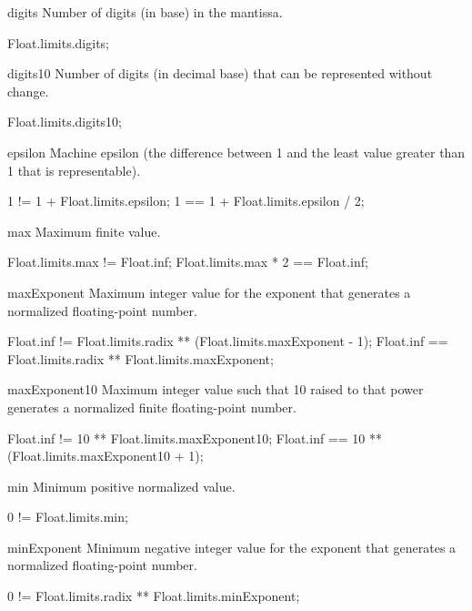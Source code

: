 \begin{urbiscriptapi}
\item[digits] Number of digits (in  base) in the mantissa.
\begin{urbiassert}
Float.limits.digits;
\end{urbiassert}


\item[digits10]
  Number of digits (in decimal base) that can be represented without
  change.
\begin{urbiassert}
Float.limits.digits10;
\end{urbiassert}


\item[epsilon]
  Machine epsilon (the difference between 1 and the least value
  greater than 1 that is representable).
\begin{urbiassert}
1 != 1 + Float.limits.epsilon;
1 == 1 + Float.limits.epsilon / 2;
\end{urbiassert}


\item[max]
  Maximum finite value.
\begin{urbiassert}
Float.limits.max     != Float.inf;
Float.limits.max * 2 == Float.inf;
\end{urbiassert}


\item[maxExponent]
  Maximum integer value for the exponent that generates a normalized
  floating-point number.
\begin{urbiassert}
Float.inf != Float.limits.radix ** (Float.limits.maxExponent - 1);
Float.inf == Float.limits.radix ** Float.limits.maxExponent;
\end{urbiassert}


\item[maxExponent10]
  Maximum integer value such that 10 raised to that power generates a
  normalized finite floating-point number.
\begin{urbiassert}
Float.inf != 10 ** Float.limits.maxExponent10;
Float.inf == 10 ** (Float.limits.maxExponent10 + 1);
\end{urbiassert}


\item[min]
  Minimum positive normalized value.
\begin{urbiassert}
0 != Float.limits.min;
\end{urbiassert}


\item[minExponent]
  Minimum negative integer value for the exponent that generates a
  normalized floating-point number.
\begin{urbiassert}
0 != Float.limits.radix ** Float.limits.minExponent;
\end{urbiassert}



\end{urbiscriptapi}
